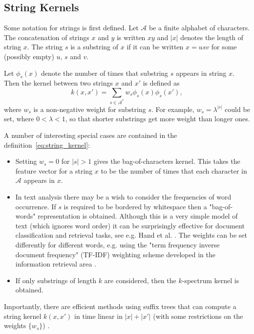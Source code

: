 \documentclass[11pt]{book}
\begin{document}
\subsection{String Kernels}
\label{sec:string_kernels}

Some notation for strings is first defined. Let $\mathcal{A}$ be a finite alphabet of characters. The concatenation of strings $x$ and $y$ is written $xy$ and $|x|$ denotes the length of string $x$. The string $s$ is a substring of $x$ if it can be written $x = usv$ for some (possibly empty) $u$, $s$ and $v$.

Let $\phi_s(x)$ denote the number of times that substring $s$ appears in string $x$. Then the kernel between two strings $x$ and $x'$ is defined as
\begin{equation}
\label{eq:string_kernel}
k(x, x') = \sum_{s \in \mathcal{A}^*} w_s \phi_s(x) \phi_s(x'),
\end{equation}
where $w_s$ is a non-negative weight for substring $s$. For example, $w_s = \lambda^{|s|}$ could be set, where $0 < \lambda < 1$, so that shorter substrings get more weight than longer ones.

A number of interesting special cases are contained in the definition~\eqref{eq:string_kernel}:
\begin{itemize}
\item Setting $w_s = 0$ for $|s| > 1$ gives the bag-of-characters kernel. This takes the feature vector for a string $x$ to be the number of times that each character in $\mathcal{A}$ appears in $x$.
\item In text analysis there may be a wish to consider the frequencies of word occurrence. If $s$ is required to be bordered by whitespace then a "bag-of-words" representation is obtained. Although this is a very simple model of text (which ignores word order) it can be surprisingly effective for document classification and retrieval tasks, see e.g. Hand et al. \cite{hand2001}. The weights can be set differently for different words, e.g. using the "term frequency inverse document frequency" (TF-IDF) weighting scheme developed in the information retrieval area \cite{salton1988}.
\item If only substrings of length $k$ are considered, then the $k$-spectrum kernel \cite{leslie2003} is obtained.
\end{itemize}

Importantly, there are efficient methods using suffix trees that can compute a string kernel $k(x, x')$ in time linear in $|x| + |x'|$ (with some restrictions on the weights $\{w_s\}$) \cite{leslie2003,vishwanathan2003}.
\end{document}
